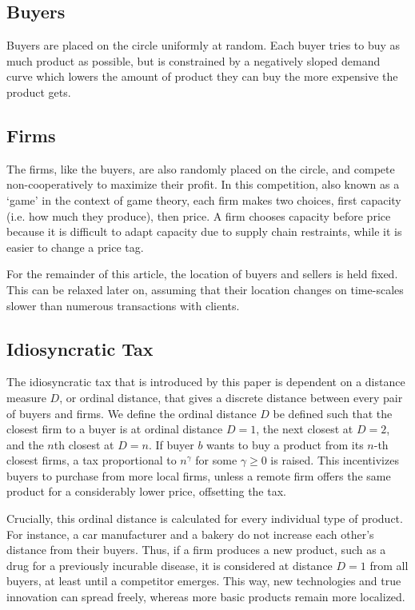 \documentclass[final,3p,times,authoryear,12pt]{elsarticle}
\begin{document}
\subsection{Buyers}
Buyers are placed on the circle uniformly at random. 
Each buyer tries to buy as much product as possible, but is constrained by a negatively sloped demand curve which lowers the amount of product they can buy the more expensive the product gets.

\subsection{Firms}
The firms, like the buyers, are also randomly placed on the circle, and compete non-cooperatively to maximize their profit. 
In this competition, also known as a `game' in the context of game theory, each firm makes two choices, first capacity (i.e. how much they produce), then price. 
A firm chooses capacity before price because it is difficult to adapt capacity due to supply chain restraints, while it is easier to change a price tag.

For the remainder of this article, the location of buyers and sellers is held fixed. 
This can be relaxed later on, assuming that their location changes on time-scales slower than numerous transactions with clients. 

\subsection{Idiosyncratic Tax}
The idiosyncratic tax that is introduced by this paper is dependent on a distance measure $D$, or ordinal distance, that gives a discrete distance between every pair of buyers and firms. 
We define the ordinal distance $D$ be defined such that the closest firm to a buyer is at ordinal distance $D=1$, the next closest at $D=2$, and the $n$th closest at $D=n$. 
If buyer $b$ wants to buy a product from its $n$-th closest firms, a tax proportional to $n^\gamma$ for some $\gamma \geqslant 0$ is raised. 
This incentivizes buyers to purchase from more local firms, unless a remote firm offers the same product for a considerably lower price, offsetting the tax. 

Crucially, this ordinal distance is calculated for every individual type of product. 
For instance, a car manufacturer and a bakery do not increase each other's distance from their buyers.
Thus, if a firm produces a new product, such as a drug for a previously incurable disease, it is considered at distance $D=1$ from all buyers, at least until a competitor emerges.
This way, new technologies and true innovation can spread freely, whereas more basic products remain more localized. 
\end{document}
